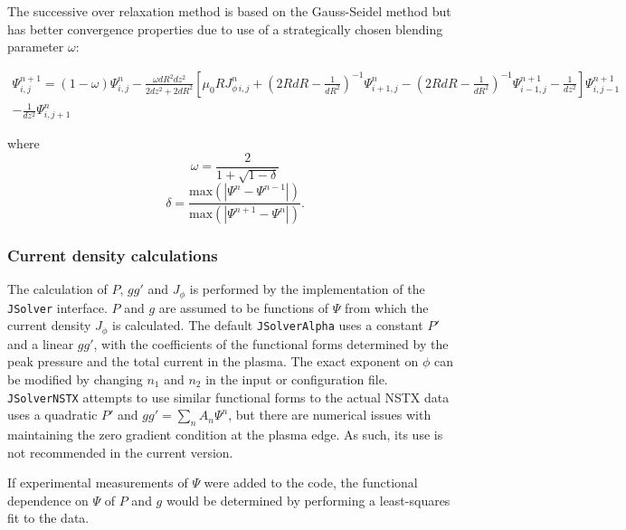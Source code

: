 \documentclass[paper=letter, fontsize=11pt]{scrartcl} %
\begin{document}
The successive over relaxation method is based on the Gauss-Seidel method but has better convergence properties due to use of a strategically chosen blending parameter $\omega$: 

\begin{multline} \label{eq:SOR}
\Psi^{n+1}_{i,j} = (1-\omega)\Psi^n_{i,j} -\frac{\omega dR^2 dz^2}{2dz^2 + 2dR^2} \left[ \mu_0 R J^n_{\phi \, i, j} + \left(2 R dR - \frac{1}{dR^2}\right)^{-1} \Psi^{n}_{i+1,j} - \left(2 R dR - \frac{1}{dR^2}\right)^{-1} \Psi^{n+1}_{i-1,j} - \frac{1}{dz^2} \right] \Psi^{n+1}_{i,j-1} \\ - \frac{1}{dz^2}\Psi^n_{i, j+1}
\end{multline}

where
\begin{equation}
\omega = \frac{2}{1 + \sqrt{1 - \delta}}
\end{equation}
\begin{equation}
\delta = \frac{\text{max} (\left| \Psi^n - \Psi^{n-1} \right| )}{\text{max} (\left| \Psi^{n+1} - \Psi^{n} \right| )}.
\end{equation}

\subsubsection{Current density calculations}
The calculation of $P$, $gg'$ and $J_\phi$ is performed by the implementation of the \texttt{JSolver} interface. $P$ and $g$ are assumed to be functions of $\Psi$ from which the current density $J_\phi$ is calculated. The default \texttt{JSolverAlpha} uses a constant $P'$ and a linear $gg'$, with the coefficients of the functional forms determined by the peak pressure and the total current in the plasma. The exact exponent on $\phi$ can be modified by changing $n_1$ and $n_2$ in the input or configuration file. \texttt{JSolverNSTX} attempts to use similar functional forms to the actual NSTX data uses a quadratic $P'$ and $gg' = \sum_n A_n\Psi^n$, but there are numerical issues with maintaining the zero gradient condition at the plasma edge. As such, its use is not recommended in the current version. 

If experimental measurements of $\Psi$ were added to the code, the functional dependence on $\Psi$ of $P$ and $g$ would be determined by performing a least-squares fit to the data. 
\end{document}
